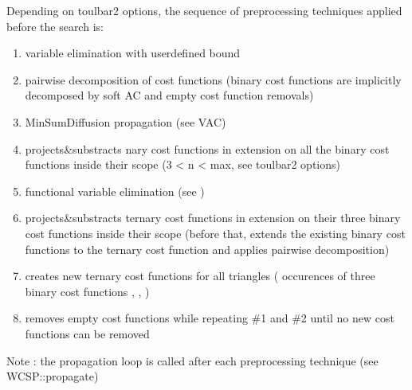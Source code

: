 \documentclass[letterpaper,10pt,openany,oneside,english]{sphinxmanual}
\begin{document}
\begin{fulllineitems}

\pysigstartsignatures
{}
\pysigstopsignatures
\sphinxAtStartPar
Depending on toulbar2 options, the sequence of preprocessing techniques applied before the search is:\begin{enumerate}
%
\item {} 
\sphinxAtStartPar
{} variable elimination with user\sphinxhyphen{}defined  bound

\item {} 
\sphinxAtStartPar
pairwise decomposition of cost functions (binary cost functions are implicitly decomposed by soft AC and empty cost function removals)

\item {} 
\sphinxAtStartPar
MinSumDiffusion propagation (see VAC)

\item {} 
\sphinxAtStartPar
projects\&substracts n\sphinxhyphen{}ary cost functions in extension on all the binary cost functions inside their scope (3 \textless{} n \textless{} max, see toulbar2 options)

\item {} 
\sphinxAtStartPar
functional variable elimination (see {\hyperref[\detokenize{ref/ref_modules:group__varelim}]{}})

\item {} 
\sphinxAtStartPar
projects\&substracts ternary cost functions in extension on their three binary cost functions inside their scope (before that, extends the existing binary cost functions to the ternary cost function and applies pairwise decomposition)

\item {} 
\sphinxAtStartPar
creates new ternary cost functions for all triangles ( occurences of three binary cost functions , , )

\item {} 
\sphinxAtStartPar
removes empty cost functions while repeating \#1 and \#2 until no new cost functions can be removed

\end{enumerate}


\sphinxAtStartPar
Note : the propagation loop is called after each preprocessing technique (see WCSP::propagate) 

\end{fulllineitems}
\end{document}
